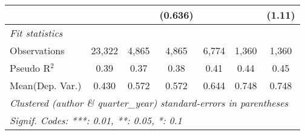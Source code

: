 \begin{tabular}{lcccccc}
                                  &                &               & (0.636)       &                &              & (1.11)\\   
   \midrule
   \emph{Fit statistics}\\
   Observations                   & 23,322         & 4,865         & 4,865         & 6,774          & 1,360        & 1,360\\  
   Pseudo R$^2$                   & 0.39           & 0.37          & 0.38          & 0.41           & 0.44         & 0.45\\  
Mean(Dep. Var.) & 0.430 & 0.572 & 0.572 & 0.644 & 0.748 & 0.748 \\
   \midrule \midrule
   \multicolumn{7}{l}{\emph{Clustered (author \& quarter\_year) standard-errors in parentheses}}\\
   \multicolumn{7}{l}{\emph{Signif. Codes: ***: 0.01, **: 0.05, *: 0.1}}\\
\end{tabular}
\par\endgroup
